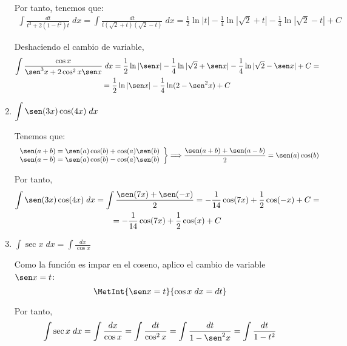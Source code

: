 \begin{ejercicio}
\begin{enumerate}
    Por tanto, tenemos que:
    \begin{multline*}
        \int \frac{dt}{t^3 +2(1-t^2)t}\;dx
        = 
        \int \frac{dt}{t(\sqrt{2}+t)(\sqrt{2}-t)}\;dx
        = \frac{1}{2}\ln|t| -\frac{1}{4}\ln |\sqrt{2}+t|
        -\frac{1}{4}\ln |\sqrt{2}-t|+C
    \end{multline*}

    Deshaciendo el cambio de variable,
    \begin{multline*}
        \int \frac{\cos x}{\sen^3x +2\cos^2x\sen x}\;dx
        = \frac{1}{2}\ln|\sen x| -\frac{1}{4}\ln |\sqrt{2}+\sen x|
        -\frac{1}{4}\ln |\sqrt{2}-\sen x|+C
        =\\=
        \frac{1}{2}\ln|\sen x| -\frac{1}{4}\ln (2-\sen^2 x)+C
    \end{multline*}

    \item $\displaystyle \int \sen(3x) \cos (4x)\;dx$

    Tenemos que:
    \begin{equation*}
        \left.\begin{array}{c}
            \sen (a+b) = \sen (a) \cos (b) + \cos (a)\sen (b) \\
            \sen (a-b) = \sen (a) \cos (b) - \cos (a)\sen (b)
        \end{array}\right\}
        \Longrightarrow
        \frac{\sen(a+b)+\sen(a-b)}{2} = \sen (a) \cos (b)
    \end{equation*}

    Por tanto,
    \begin{multline*}
        \int \sen(3x) \cos (4x)\;dx = \int \frac{\sen (7x) +\sen (-x)}{2}
        = -\frac{1}{14}\cos(7x) + \frac{1}{2}\cos(-x)+C
        =\\= -\frac{1}{14}\cos(7x) + \frac{1}{2}\cos(x)+C
    \end{multline*}


    \item $\displaystyle \int \sec x \;dx = \int\frac{dx}{\cos x}$ \label{Ej1.Apartado_s}

    Como la función es impar en el coseno, aplico el cambio de variable $\sen x =t$:
    \begin{equation*}
        \MetInt{\sen x =t}{\cos x\;dx= dt}
    \end{equation*}

    Por tanto,
    \begin{equation*}
        \int \sec x \;dx = \int\frac{dx}{\cos x}
        =\int \frac{dt}{\cos^2 x}
        =\int \frac{dt}{1-\sen^2 x}
        =\int \frac{dt}{1-t^2}
    \end{equation*}


\end{enumerate}
\end{ejercicio}
